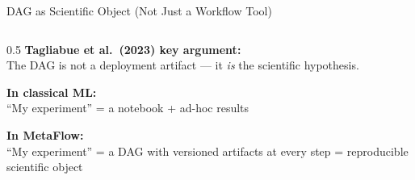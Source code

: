 \documentclass[10pt,aspectratio=169]{beamer}
\begin{document}
\begin{frame}{DAG as Scientific Object (Not Just a Workflow Tool)}

\begin{columns}
\begin{column}{0.5\textwidth}
\small
\textbf{Tagliabue et al.\ (2023) key argument:}\\
The DAG is not a deployment artifact --- it \emph{is} the scientific hypothesis.

\vspace{0.3cm}
\textbf{In classical ML:}\\
``My experiment'' = a notebook + ad-hoc results

\vspace{0.3cm}
\textbf{In MetaFlow:}\\
``My experiment'' = a DAG with versioned artifacts at every step = reproducible scientific object


\end{column}
\end{columns}
\end{frame}
\end{document}

